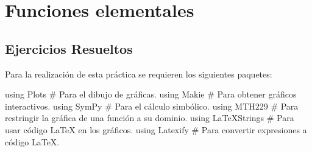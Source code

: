 \documentclass[
  a4paper,
]{scrreport}
\newenvironment{Shaded}{\begin{snugshade}}{\end{snugshade}}
\newcommand{\BuiltInTok}[1]{\textcolor[rgb]{0.00,0.23,0.31}{#1}}
\newcommand{\CommentTok}[1]{\textcolor[rgb]{0.37,0.37,0.37}{#1}}
\newcommand{\ImportTok}[1]{\textcolor[rgb]{0.00,0.46,0.62}{#1}}
\theoremstyle{definition}
\theoremstyle{remark}
\begin{document}

\hypertarget{funciones-elementales}{%
\chapter{Funciones elementales}\label{funciones-elementales}}

\hypertarget{ejercicios-resueltos-1}{%
\section{Ejercicios Resueltos}\label{ejercicios-resueltos-1}}

Para la realización de esta práctica se requieren los siguientes
paquetes:

\begin{Shaded}
\begin{Highlighting}[]
\ImportTok{using} \BuiltInTok{Plots  }\CommentTok{\# Para el dibujo de gráficas.}
\ImportTok{using} \BuiltInTok{Makie }\CommentTok{\# Para obtener gráficos interactivos.}
\ImportTok{using} \BuiltInTok{SymPy }\CommentTok{\# Para el cálculo simbólico.}
\ImportTok{using} \BuiltInTok{MTH229 }\CommentTok{\# Para restringir la gráfica de una función a su dominio.}
\ImportTok{using} \BuiltInTok{LaTeXStrings  }\CommentTok{\# Para usar código LaTeX en los gráficos.}
\ImportTok{using} \BuiltInTok{Latexify  }\CommentTok{\# Para convertir expresiones a código LaTeX.}
\end{Highlighting}
\end{Shaded}
\end{document}
